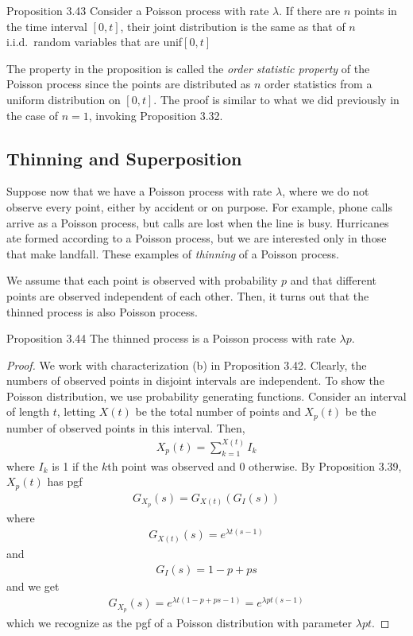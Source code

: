 \begin{boks}{Proposition 3.43}
  Consider a Poisson process with rate $\lambda$. If there are $n$ points in the time interval $[0,t]$, their joint distribution is the same as that of $n$ i.i.d.\ random variables that are unif$[0,t]$
\end{boks}

The property in the proposition is called the \emph{order statistic property} of the Poisson process since the points are distributed as $n$ order statistics from a uniform distribution on $[0,t]$.
The proof is similar to what we did previously in the case of $n = 1$,
invoking Proposition 3.32.

\subsection{Thinning and Superposition}
Suppose now that we have a Poisson process with rate $\lambda$, where we do not observe every point, either by accident or on purpose.
For example, phone calls arrive as a Poisson process, but calls are lost when the line is busy.
Hurricanes ate formed according to a Poisson process, but we are interested only in those that make landfall.
These examples of \emph{thinning} of a Poisson process.

We assume that each point is observed with probability $p$ and that different points are observed independent of each other.
Then, it turns out that the thinned process is also Poisson process.

\begin{boks}{Proposition 3.44}
  The thinned process is a Poisson process with rate $\lambda p$.
\end{boks}

\begin{proof}
  We work with characterization (b) in Proposition 3.42. Clearly, the numbers of observed points in disjoint intervals are independent.
  To show the Poisson distribution, we use probability generating functions.
  Consider an interval of length $t$, letting $X(t)$ be the total number of points and $X_p(t)$ be the number of observed points in this interval.
  Then,
  \begin{align*}
    X_p(t) = \sum_{k = 1}^{X(t)} I_k
  \end{align*}
  where $I_k$ is 1 if the $k$th point was observed and 0 otherwise. By Proposition 3.39, $X_p(t)$ has pgf
  \begin{align*}
    G_{X_p}(s) = G_{X(t)}(G_{I}(s))
  \end{align*}
  where
  \begin{align*}
    G_{X(t)}(s) = e^{\lambda t (s - 1)}
  \end{align*}
  and
  \begin{align*}
    G_I(s) = 1 - p + ps
  \end{align*}
  and we get
  \begin{align*}
    G_{X_p}(s) = e^{\lambda t(1 - p + ps - 1)} = e^{\lambda pt(s - 1)}
  \end{align*}
  which we recognize as the pgf of a Poisson distribution with parameter $\lambda pt$.
\end{proof}

